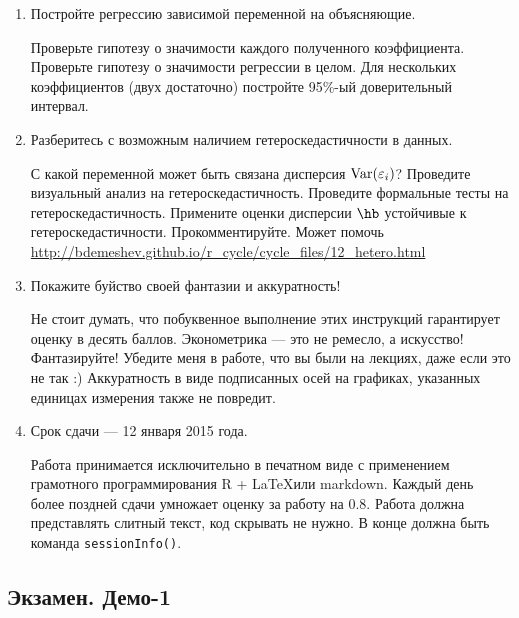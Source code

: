 \documentclass[12pt, a4paper]{article}
\theoremstyle{definition}
\begin{document}
\begin{enumerate}
\item Постройте регрессию зависимой переменной на объясняющие.

Проверьте гипотезу о значимости каждого полученного коэффициента. Проверьте гипотезу о значимости регрессии в целом. Для нескольких коэффициентов (двух достаточно) постройте 95\%-ый доверительный интервал.

\item Разберитесь с возможным наличием гетероскедастичности в данных.

С какой переменной может быть связана дисперсия $\operatorname{Var}(\varepsilon_i)$? Проведите визуальный анализ на гетероскедастичность. Проведите формальные тесты на гетероскедастичность. Примените оценки дисперсии $\hb$ устойчивые к гетероскедастичности. Прокомментируйте. Может помочь \url{http://bdemeshev.github.io/r_cycle/cycle_files/12_hetero.html}

\item Покажите буйство своей фантазии и аккуратность!

Не стоит думать, что побуквенное выполнение этих инструкций гарантирует оценку в десять баллов. Эконометрика — это не ремесло, а искусство! Фантазируйте! Убедите меня в работе, что вы были на лекциях, даже если это не так :) Аккуратность в виде подписанных осей на графиках, указанных единицах измерения также не повредит.

\item Срок сдачи — 12 января 2015 года.

Работа принимается исключительно в печатном виде с применением грамотного программирования R + \LaTeX или markdown. Каждый день более поздней сдачи умножает оценку за работу на $0.8$.  Работа должна представлять слитный текст, код скрывать не нужно. В конце должна быть команда \verb|sessionInfo()|.





\end{enumerate}


\subsection{Экзамен. Демо-1}
\end{document}
